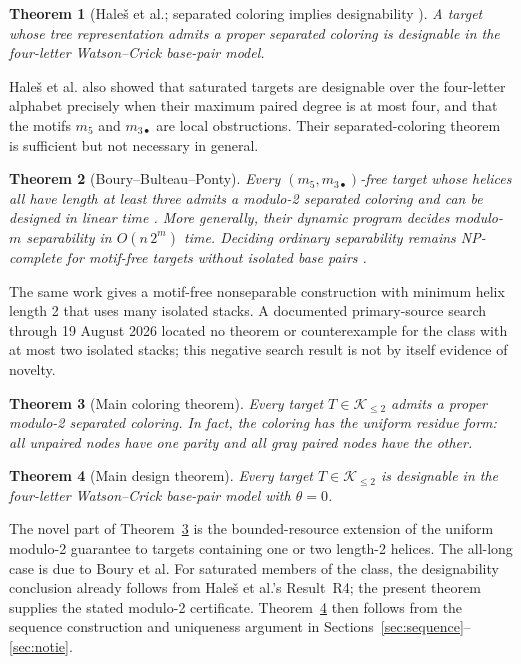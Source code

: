 \documentclass[11pt]{article}
\newtheorem{theorem}{Theorem}[section]
\newcommand{\Ktwo}{\mathcal{K}_{\le 2}}
\begin{document}
\begin{theorem}[Hale\v{s} et al.; separated coloring implies designability \citep{hales2017}]
A target whose tree representation admits a proper separated coloring is designable in the four-letter Watson--Crick base-pair model.
\end{theorem}

Hale\v{s} et al. also showed that saturated targets are designable over the four-letter alphabet precisely when their maximum paired degree is at most four, and that the motifs $m_5$ and $m_{3\bullet}$ are local obstructions.  Their separated-coloring theorem is sufficient but not necessary in general.

\begin{theorem}[Boury--Bulteau--Ponty]
Every $(m_5,m_{3\bullet})$-free target whose helices all have length at least three admits a modulo-2 separated coloring and can be designed in linear time \citep{boury2024,boury2025}.  More generally, their dynamic program decides modulo-$m$ separability in $O(n\,2^m)$ time.  Deciding ordinary separability remains NP-complete for motif-free targets without isolated base pairs \citep{boury2025}.
\end{theorem}

The same work gives a motif-free nonseparable construction with minimum helix length 2 that uses many isolated stacks.  A documented primary-source search through 19 August 2026 located no theorem or counterexample for the class with at most two isolated stacks; this negative search result is not by itself evidence of novelty.

\begin{theorem}[Main coloring theorem]
\label{thm:maincolor}
Every target $T\in\Ktwo$ admits a proper modulo-2 separated coloring.  In fact, the coloring has the uniform residue form: all unpaired nodes have one parity and all gray paired nodes have the other.
\end{theorem}

\begin{theorem}[Main design theorem]
\label{thm:maindesign}
Every target $T\in\Ktwo$ is designable in the four-letter Watson--Crick base-pair model with $\theta=0$.
\end{theorem}

The novel part of Theorem~\ref{thm:maincolor} is the bounded-resource extension of the uniform modulo-2 guarantee to targets containing one or two length-2 helices.  The all-long case is due to Boury et al.  For saturated members of the class, the designability conclusion already follows from Hale\v{s} et al.'s Result~R4; the present theorem supplies the stated modulo-2 certificate.  Theorem~\ref{thm:maindesign} then follows from the sequence construction and uniqueness argument in Sections~\ref{sec:sequence}--\ref{sec:notie}.
\end{document}
